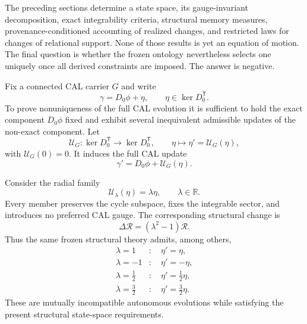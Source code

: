 \documentclass[aip,jmp,amsmath,amssymb,reprint]{revtex4-2}
\newcommand{\Rcal}{\mathcal{R}}
\newcommand{\kerop}{\operatorname{ker}}
\begin{document}
The preceding sections determine a state space, its gauge-invariant decomposition, exact integrability criteria, structural memory measures, provenance-conditioned accounting of realized changes, and restricted laws for changes of relational support. None of those results is yet an equation of motion. The final question is whether the frozen ontology nevertheless selects one uniquely once all derived constraints are imposed. The answer is negative.

Fix a connected CAL carrier $G$ and write
\begin{equation}
\gamma=D_0\phi+\eta,
\qquad
\eta\in\kerop D_0^{\mathsf T}.
\end{equation}
To prove nonuniqueness of the full CAL evolution it is sufficient to hold the exact component $D_0\phi$ fixed and exhibit several inequivalent admissible updates of the non-exact component. Let
\begin{equation}
\mathcal U_G:\kerop D_0^{\mathsf T}\longrightarrow\kerop D_0^{\mathsf T},
\qquad
\eta\longmapsto\eta'=\mathcal U_G(\eta),
\label{eq:memory-generator-map}
\end{equation}
with $\mathcal U_G(0)=0$. It induces the full CAL update
\begin{equation}
\gamma'=D_0\phi+\mathcal U_G(\eta).
\label{eq:full-cal-witness}
\end{equation}

Consider the radial family
\begin{equation}
\mathcal U_{\lambda}(\eta)=\lambda\eta,
\qquad
\lambda\in\mathbb R.
\label{eq:radial-family}
\end{equation}
Every member preserves the cycle subspace, fixes the integrable sector, and introduces no preferred CAL gauge. The corresponding structural change is
\begin{equation}
\Delta\Rcal=(\lambda^2-1)\Rcal.
\label{eq:radial-R-change}
\end{equation}
Thus the same frozen structural theory admits, among others,
\begin{align}
\lambda=1 &: \quad \eta'=\eta,\\
\lambda=-1 &: \quad \eta'=-\eta,\\
\lambda=\tfrac12 &: \quad \eta'=\tfrac12\eta,\\
\lambda=\tfrac32 &: \quad \eta'=\tfrac32\eta.
\end{align}
These are mutually incompatible autonomous evolutions while satisfying the present structural state-space requirements.
\end{document}
